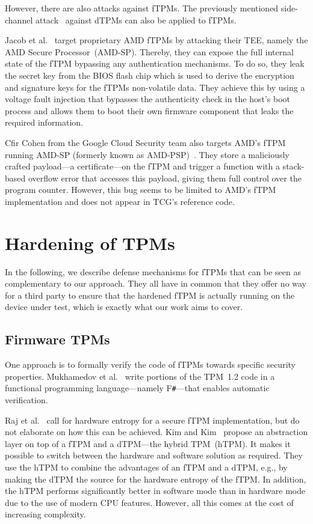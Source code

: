 However, there are also attacks against \acp{fTPM}.
The previously mentioned side-channel attack~\cite{Moghimi2019} against \acp{dTPM} can also be applied to \acp{fTPM}.

Jacob et al.~\cite{Jacob2023} target proprietary AMD fTPMs by attacking their \ac{TEE}, namely the AMD Secure Processor~(AMD-SP).
Thereby, they can expose the full internal state of the \ac{fTPM} bypassing any authentication mechanisms.
To do so, they leak the secret key from the BIOS flash chip which is used to derive the encryption and signature keys for the \acp{fTPM} non-volatile data.
They achieve this by using a voltage fault injection that bypasses the authenticity check in the host's boot process and allows them to boot their own firmware component that leaks the required information.

Cfir Cohen from the Google Cloud Security team also targets AMD's fTPM running AMD-SP (formerly known as AMD-PSP)~\cite{cohen}.
They store a maliciously crafted payload---a certificate---on the \ac{fTPM} and trigger a function with a stack-based overflow error that accesses this payload, giving them full control over the program counter.
However, this bug seems to be limited to AMD's fTPM implementation and does not appear in TCG's reference code.

\section{Hardening of TPMs}

In the following, we describe defense mechanisms for fTPMs that can be seen as complementary to our approach.
They all have in common that they offer no way for a third party to ensure that the hardened fTPM is actually running on the device under test, which is exactly what our work aims to cover.

\subsection{Firmware TPMs}

One approach is to formally verify the code of fTPMs towards specific security properties.
Mukhamedov et al.~\cite{Mukhamedov2013} write portions of the TPM~1.2 code in a functional programming language---namely F\texttt{\#}---that enables automatic verification.

Raj et al.~\cite{Raj2015} call for hardware entropy for a secure \ac{fTPM} implementation, but do not elaborate on how this can be achieved.
Kim and Kim~\cite{Kim2019} propose an abstraction layer on top of a \ac{fTPM} and a \ac{dTPM}---the hybrid TPM~(hTPM).
It makes it possible to switch between the hardware and software solution as required.
They use the hTPM to combine the advantages of an \ac{fTPM} and a \ac{dTPM}, e.g., by making the dTPM the source for the hardware entropy of the fTPM\@.
In addition, the hTPM performs significantly better in software mode than in hardware mode due to the use of modern CPU features.
However, all this comes at the cost of increasing complexity.

